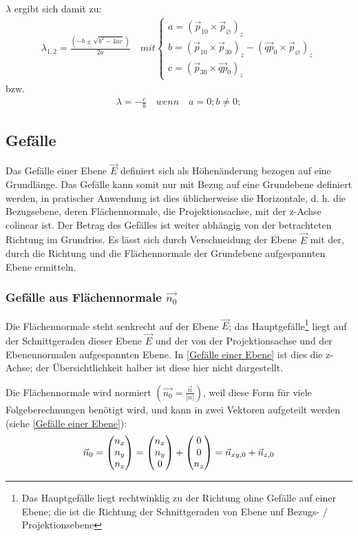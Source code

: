 $\lambda$ ergibt sich damit zu:
\begin{align}
	\boxed{
		\lambda_{1, 2} = \frac{(-b\pm \sqrt{b^{2}-4ac})}{2a}
	} \quad mit \begin{cases}a = (\vec{p}_{10} \times \vec{p}_{\varnothing})_{z}\\
	b = (\vec{p}_{10} \times \vec{p}_{30})_{z} - (\vec{qp}_{0} \times \vec{p}_{\varnothing})_{z}\\
	c = (\vec{p}_{30} \times \vec{qp}_{0})_{z}
	\end{cases}
\end{align}
bzw.
\begin{align}
	\boxed{
		\lambda = -\frac{c}{b}
	} \quad wenn \quad a=0; b\neq0;
\end{align}

\subsection{Gefälle}
Das Gefälle einer Ebene $\vec{E}$ definiert sich als Höhenänderung bezogen auf eine Grundlänge. Das Gefälle kann somit nur mit Bezug auf eine Grundebene definiert werden, in pratischer Anwendung ist dies üblicherweise die Horizontale, d. h. die Bezugsebene, deren Flächennormale, die Projektionsachse, mit der z-Achse colinear ist. Der Betrag des Gefälles ist weiter abhängig von der betrachteten Richtung im Grundriss. Es lässt sich durch Verschneidung der Ebene $\vec{E}$ mit der, durch die Richtung und die Flächennormale der Grundebene aufgespannten Ebene ermitteln.

\subsubsection{Gefälle aus Flächennormale $\vec{n_{0}}$}
Die Flächennormale steht senkrecht auf der Ebene $\vec{E}$; das Hauptgefälle\footnote{Das Hauptgefälle liegt rechtwinklig zu der Richtung ohne Gefälle auf einer Ebene; die ist die Richtung der Schnittgeraden von Ebene unf Bezugs- / Projektionsebene} liegt auf der Schnittgeraden dieser Ebene $\vec{E}$ und der von der Projektionsachse und der Ebenennormalen aufgespannten Ebene. In \cref{Gefälle einer Ebene} ist dies die z-Achse; der Übersichtlichkeit halber ist diese hier nicht dargestellt.

Die Flächennormale wird normiert $(\vec{n_{0}} = \frac{\vec{n}}{|n|})$, weil diese Form für viele Folgeberechnungen benötigt wird, und kann in zwei Vektoren aufgeteilt werden (siehe \cref{Gefälle einer Ebene}):
\begin{equation*}
	\vec{n}_{0} = \begin{pmatrix} n_{x} \\ n_{y} \\ n_{z} \end{pmatrix}
	=\begin{pmatrix} n_{x} \\ n_{y} \\ 0 \end{pmatrix} + \begin{pmatrix} 0 \\ 0 \\ n_{z} \end{pmatrix}
	=\vec{n}_{xy, 0} + \vec{n}_{z, 0}
\end{equation*}

